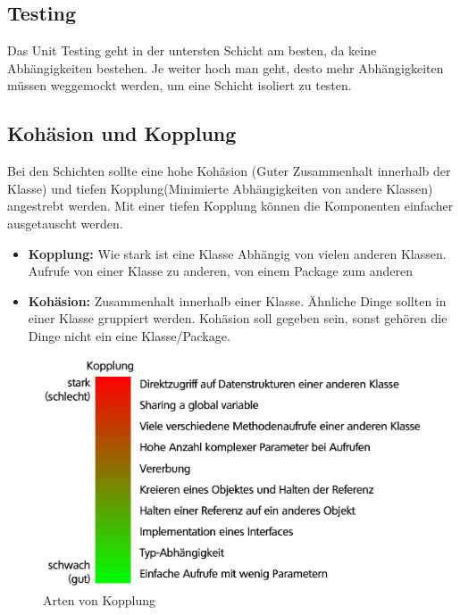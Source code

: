 \subsection{Testing}
Das Unit Testing geht in der untersten Schicht am besten, da keine Abhängigkeiten bestehen. Je weiter hoch man geht, desto mehr Abhängigkeiten müssen weggemockt werden, um eine Schicht isoliert zu testen.


\subsection{Kohäsion und Kopplung}
Bei den Schichten  sollte eine hohe Kohäsion (Guter Zusammenhalt innerhalb der Klasse) und tiefen Kopplung(Minimierte Abhängigkeiten von andere Klassen) angestrebt werden. Mit einer tiefen Kopplung können die Komponenten einfacher ausgetauscht werden.
\begin{itemize}
	\item \textbf{Kopplung:} Wie stark ist eine Klasse Abhängig von vielen anderen Klassen. Aufrufe von einer Klasse zu anderen, von einem Package zum anderen
	\item \textbf{Kohäsion:} Zusammenhalt innerhalb einer Klasse. Ähnliche Dinge sollten in einer Klasse gruppiert werden. Kohäsion soll gegeben sein, sonst gehören die Dinge nicht ein eine Klasse/Package.
\end{itemize}

\begin{figure}[h]
	\centering
	\includegraphics[width=0.7\linewidth]{images/kopplung_kohaesion}
	\caption{Arten von Kopplung}
	\label{fig:kopplungkohaesion}
\end{figure}


